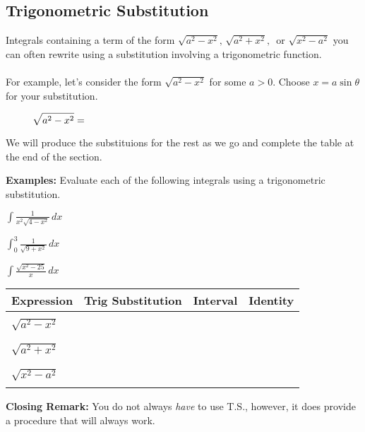 \subsection*{Trigonometric Substitution}
Integrals containing a term of the form $\displaystyle\sqrt{a^2-x^2},\,\sqrt{a^2+x^2},\,$ or $\displaystyle\sqrt{x^2-a^2}$ you can often rewrite using a substitution involving a trigonometric function.\\
\\
For example, let's consider the form $\displaystyle\sqrt{a^2-x^2}$ for some $a>0$. Choose $x=a\sin\theta$ for your substitution.

\[\sqrt{a^2-x^2}=\hspace{3.5in}\]

We will produce the substituions for the rest as we go and complete the table at the end of the section.

\vspace{.5in}

\textbf{Examples:} Evaluate each of the following integrals using a trigonometric substitution.

\begin{questions}
    \question $\displaystyle\int\frac{1}{x^2\sqrt{4-x^2}}\,dx$
    
    \question $\displaystyle\int_0^3 \frac{1}{\sqrt{9+x^2}}\,dx$
    
    \newpage
    
    \question $\displaystyle\int\frac{\sqrt{x^2-25}}{x}\,dx$

    
\end{questions}

\vspace{5in}


\begin{longtable}[b]{|C{3.667cm}|C{3.667cm}|C{3.667cm}|C{3.7cm}|}
    \hline
    \textbf{Expression}\Tstrut\Bstrut & \textbf{Trig Substitution}\Tstrut\Bstrut & \textbf{Interval}\Tstrut\Bstrut & \textbf{Identity}\Tstrut\Bstrut \\\hline
    & & & \\
    $\displaystyle\sqrt{a^2-x^2}$\Tstrut\Bstrut & & & \\
    & & & \\\hline
    & & & \\
    $\displaystyle\sqrt{a^2+x^2}$\Tstrut\Bstrut & & & \\
    & & & \\\hline
    & & & \\
    $\displaystyle\sqrt{x^2-a^2}$\Tstrut\Bstrut & & & \\
    & & & \\\hline
    
\end{longtable}

\textbf{Closing Remark:} You do not always \textit{have} to use T.S., however, it does provide a procedure that will always work.


\newpage
